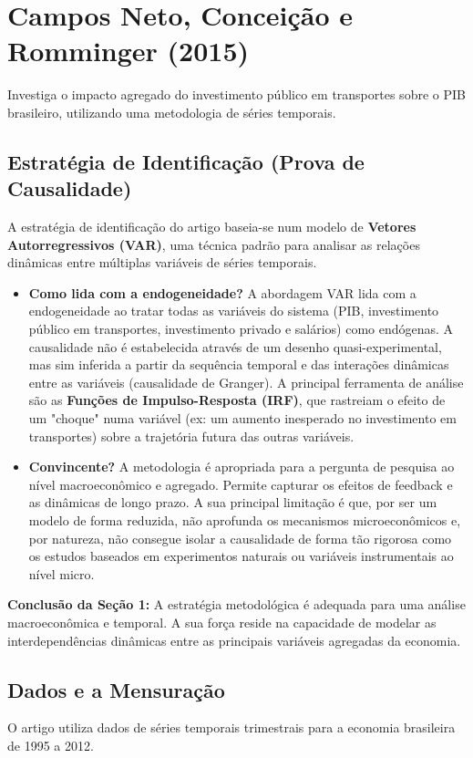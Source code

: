 \documentclass[12pt, a4paper]{article}
\begin{document}
\section{Campos Neto, Conceição e Romminger (2015)}
Investiga o impacto agregado do investimento público em transportes sobre o PIB brasileiro, utilizando uma metodologia de séries temporais.

\subsection{Estratégia de Identificação (Prova de Causalidade)}
A estratégia de identificação do artigo baseia-se num modelo de \textbf{Vetores Autorregressivos (VAR)}, uma técnica padrão para analisar as relações dinâmicas entre múltiplas variáveis de séries temporais.

\begin{itemize}
    \item \textbf{Como lida com a endogeneidade?} A abordagem VAR lida com a endogeneidade ao tratar todas as variáveis do sistema (PIB, investimento público em transportes, investimento privado e salários) como endógenas. A causalidade não é estabelecida através de um desenho quasi-experimental, mas sim inferida a partir da sequência temporal e das interações dinâmicas entre as variáveis (causalidade de Granger). A principal ferramenta de análise são as \textbf{Funções de Impulso-Resposta (IRF)}, que rastreiam o efeito de um "choque" numa variável (ex: um aumento inesperado no investimento em transportes) sobre a trajetória futura das outras variáveis.
    \item \textbf{Convincente?} A metodologia é apropriada para a pergunta de pesquisa ao nível macroeconômico e agregado. Permite capturar os efeitos de feedback e as dinâmicas de longo prazo. A sua principal limitação é que, por ser um modelo de forma reduzida, não aprofunda os mecanismos microeconômicos e, por natureza, não consegue isolar a causalidade de forma tão rigorosa como os estudos baseados em experimentos naturais ou variáveis instrumentais ao nível micro.
\end{itemize}

\noindent\textbf{Conclusão da Seção 1:} A estratégia metodológica é adequada para uma análise macroeconômica e temporal. A sua força reside na capacidade de modelar as interdependências dinâmicas entre as principais variáveis agregadas da economia.

\subsection{Dados e a Mensuração}
O artigo utiliza dados de séries temporais trimestrais para a economia brasileira de 1995 a 2012.
\end{document}
